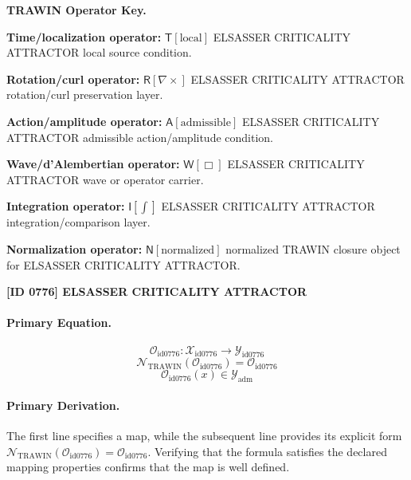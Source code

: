 \par\vspace{0.45\baselineskip}
\noindent\begin{minipage}[t]{\linewidth}
\begingroup
\small
\raggedright
\textbf{TRAWIN Operator Key.}\par
\noindent\textbf{Time/localization operator:} $\mathsf{T}\!\left[\mathrm{local}\right]$ ELSASSER CRITICALITY ATTRACTOR local source condition.\par
\noindent\textbf{Rotation/curl operator:} $\mathsf{R}\!\left[\nabla\times\right]$ ELSASSER CRITICALITY ATTRACTOR rotation/curl preservation layer.\par
\noindent\textbf{Action/amplitude operator:} $\mathsf{A}\!\left[\mathrm{admissible}\right]$ ELSASSER CRITICALITY ATTRACTOR admissible action/amplitude condition.\par
\noindent\textbf{Wave/d'Alembertian operator:} $\mathsf{W}\!\left[\Box\right]$ ELSASSER CRITICALITY ATTRACTOR wave or operator carrier.\par
\noindent\textbf{Integration operator:} $\mathsf{I}\!\left[\int\right]$ ELSASSER CRITICALITY ATTRACTOR integration/comparison layer.\par
\noindent\textbf{Normalization operator:} $\mathsf{N}\!\left[\mathrm{normalized}\right]$ normalized TRAWIN closure object for ELSASSER CRITICALITY ATTRACTOR.\par
\endgroup
\end{minipage}

\clearpage
\noindent\textbf{[ID 0776] ELSASSER CRITICALITY ATTRACTOR}\par
\vspace{0.35em}
\paragraph{Primary Equation.}
\[
\mathcal{O}_{\mathrm{id0776}}:\mathcal{X}_{\mathrm{id0776}}\longrightarrow\mathcal{Y}_{\mathrm{id0776}}
\]
\[
\mathcal{N}_{\mathrm{TRAWIN}}(\mathcal{O}_{\mathrm{id0776}})=\mathcal{O}_{\mathrm{id0776}}
\]
\[
\mathcal{O}_{\mathrm{id0776}}(x)\in\mathcal{Y}_{\mathrm{adm}}
\]

\paragraph{Primary Derivation.}
The first line specifies a map, while the subsequent line provides its explicit form \( \mathcal{N}_{\mathrm{TRAWIN}}(\mathcal{O}_{\mathrm{id0776}})=\mathcal{O}_{\mathrm{id0776}} \). Verifying that the formula satisfies the declared mapping properties confirms that the map is well defined.
